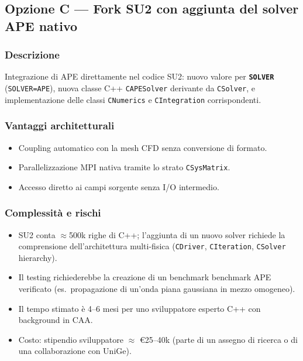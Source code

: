 \documentclass[11pt,a4paper]{article}
\newcommand{\kw}[1]{\texttt{\color{keywordcolor}\bfseries #1}}
\begin{document}
\subsection{Opzione C — Fork SU2 con aggiunta del solver APE nativo}

\subsubsection{Descrizione}

Integrazione di APE direttamente nel codice SU2: nuovo valore per
\kw{SOLVER} (\texttt{SOLVER=APE}), nuova classe C++ \texttt{CAPESolver}
derivante da \texttt{CSolver}, e implementazione delle classi
\texttt{CNumerics} e \texttt{CIntegration} corrispondenti.

\subsubsection{Vantaggi architetturali}

\begin{itemize}
  \item Coupling automatico con la mesh CFD senza conversione di formato.
  \item Parallelizzazione MPI nativa tramite lo strato \texttt{CSysMatrix}.
  \item Accesso diretto ai campi sorgente senza I/O intermedio.
\end{itemize}

\subsubsection{Complessità e rischi}

\begin{itemize}
  \item SU2 conta $\approx$500k righe di C++; l'aggiunta di un nuovo solver
        richiede la comprensione dell'architettura multi-fisica
        (\texttt{CDriver}, \texttt{CIteration}, \texttt{CSolver} hierarchy).
  \item Il testing richiederebbe la creazione di un benchmark benchmark APE
        verificato (es.\ propagazione di un'onda piana gaussiana in mezzo omogeneo).
  \item Il tempo stimato è 4–6 mesi per uno sviluppatore esperto C++ con
        background in CAA.
  \item Costo: stipendio sviluppatore $\approx$ €25–40k (parte di un assegno di
        ricerca o di una collaborazione con UniGe).
\end{itemize}
\end{document}
